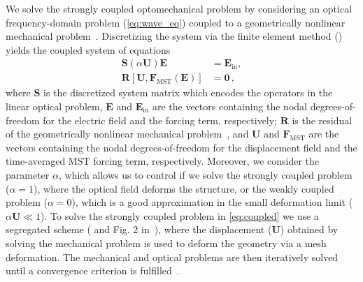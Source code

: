 We solve the strongly coupled optomechanical problem by considering an optical frequency-domain problem (\eqref{eq:wave_eq}) coupled to a geometrically nonlinear mechanical problem~\cite{ownpub5,cook_concepts_2001}. Discretizing the system via the finite element
method () yields the coupled system of equations
\begin{equation}\label{eq:coupled}
    \begin{aligned}
 \mathbf{S}\left(\alpha\mathbf{U}\right) \mathbf{E} &= \mathbf{E}_\text{in} , \\
 \mathbf{R}[\mathbf{U}, \mathbf{F}_\text{MST}(\mathbf{E})] &=\mathbf{0}\,,
    \end{aligned}
    \end{equation}
where $\mathbf{S}$ is the discretized system matrix which encodes the operators
 in the linear optical problem, $\mathbf{E}$ and 
 $\mathbf{E}_\text{in}$ are the vectors containing the nodal degrees-of-freedom for the electric 
field and the forcing term, respectively; $\mathbf{R}$ is the residual of the
 geometrically nonlinear mechanical problem~\cite{cook_concepts_2001}, and 
 $\mathbf{U}$ and $\mathbf{F}_\text{MST}$ are the vectors containing the nodal
 degrees-of-freedom for the displacement field and the time-averaged MST forcing term, respectively. 
 Moreover, we consider the parameter $\alpha$, which allows us to control if we solve 
 the strongly coupled problem ($\alpha=1$), where the optical field deforms the structure, 
 or the weakly coupled problem ($\alpha=0$), which is a good approximation in the small deformation 
 limit ($\alpha\mathbf{U} \ll 1$). To solve the strongly coupled problem in 
  \eqref{eq:coupled} we use a segregated scheme ( and Fig. 2 in~\cite{ownpub5}), where the displacement ($\mathbf{U}$) obtained
 by solving the mechanical problem is used to deform the geometry via a mesh deformation. The mechanical and
 optical problems are then iteratively solved until a convergence criterion is fulfilled~\cite {ownpub5}.

